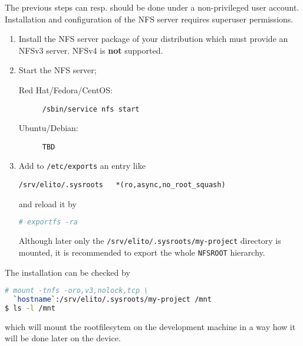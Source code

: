 The previous steps can resp. should be done under a non-privileged
user account.  Installation and configuration of the NFS server
requires superuser permissions.

\begin{enumerate}[resume]
\item Install the NFS server package of your distribution which must
  provide an NFSv3 server. NFSv4 is \textbf{not} supported.
\item Start the NFS server;

  \begin{description}
  \item[Red Hat/Fedora/CentOS:] \lstinline[language=sh]{/sbin/service nfs start}
  \item[Ubuntu/Debian:] \lstinline[language=sh]{TBD}
  \end{description}
\item Add to \texttt{/etc/exports} an entry like
\begin{verbatim}
/srv/elito/.sysroots   *(ro,async,no_root_squash)
\end{verbatim} and reload it by
\begin{lstlisting}[language=sh]
# exportfs -ra
\end{lstlisting}

  Although later only the \texttt{/srv/elito/.sysroots/my-project}
  directory is mounted, it is recommended to export the whole
  \texttt{NFSROOT} hierarchy.

\end{enumerate}

The installation can be checked by
\begin{lstlisting}[language=sh]
# mount -tnfs -oro,v3,nolock,tcp \
  `hostname`:/srv/elito/.sysroots/my-project /mnt
$ ls -l /mnt
\end{lstlisting}%
  which will mount the rootfilesytem on the development machine in a
  way how it will be done later on the device.

